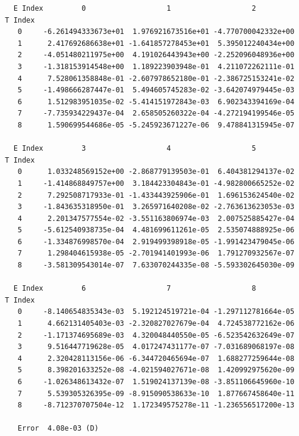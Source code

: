 \documentclass[12pt,dvipdfmx]{article}
\begin{document}
\begin{small}\begin{verbatim}
    E Index         0                   1                   2
  T Index
     0     -6.261494333673e+01  1.976921673516e+01 -4.770700042332e+00
     1      2.417692686638e+01 -1.641857278453e+01  5.395012240434e+00
     2     -4.051480211975e+00  4.191026443943e+00 -2.252096048936e+00
     3     -1.318153914548e+00  1.189223903948e-01  4.211072262111e-01
     4      7.528061358848e-01 -2.607978652180e-01 -2.386725153241e-02
     5     -1.498666287447e-01  5.494605745283e-02 -3.642074979445e-03
     6      1.512983951035e-02 -5.414151972843e-03  6.902343394169e-04
     7     -7.735934229437e-04  2.658505260322e-04 -4.272194199546e-05
     8      1.590699544686e-05 -5.245923671227e-06  9.478841315945e-07

    E Index         3                   4                   5
  T Index
     0      1.033248569152e+00 -2.868779139503e-01  6.404381294137e-02
     1     -1.414868849757e+00  3.184423304843e-01 -4.982800665252e-02
     2      7.292508717933e-01 -1.433443925906e-01  1.696153624540e-02
     3     -1.843635318950e-01  3.265971640208e-02 -2.763613623053e-03
     4      2.201347577554e-02 -3.551163806974e-03  2.007525885427e-04
     5     -5.612540938735e-04  4.481699611261e-05  2.535074888925e-06
     6     -1.334876998570e-04  2.919499398918e-05 -1.991423479045e-06
     7      1.298404615938e-05 -2.701941401993e-06  1.791270932567e-07
     8     -3.581309543014e-07  7.633070244335e-08 -5.593302645030e-09

    E Index         6                   7                   8
  T Index
     0     -8.140654835343e-03  5.192124519721e-04 -1.297112781664e-05
     1      4.662131405403e-03 -2.320827027679e-04  4.724538772162e-06
     2     -1.171374695689e-03  4.320048440550e-05 -6.523542632649e-07
     3      9.516447719628e-05  4.017247431177e-07 -7.031689068197e-08
     4      2.320428113156e-06 -6.344720465694e-07  1.688277259644e-08
     5      8.398201633252e-08 -4.021594027671e-08  1.420992975620e-09
     6     -1.026348613432e-07  1.519024137139e-08 -3.851106645960e-10
     7      5.539305326395e-09 -8.915090538633e-10  1.877667458640e-11
     8     -8.712370707504e-12  1.172349575278e-11 -1.236556517200e-13

     Error  4.08e-03 (D)
\end{verbatim}\end{small}
\end{document}
